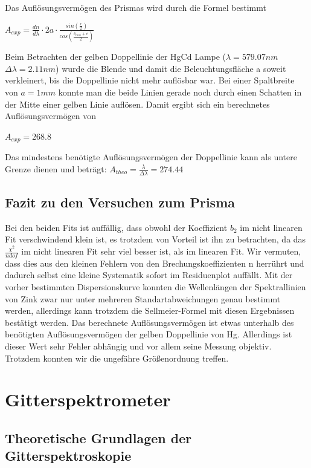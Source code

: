 \documentclass[a4paper, 11pt]{article}
\begin{document}
Das Auflösungsvermögen des Prismas wird durch die Formel bestimmt
\begin{center}
$A_{exp}=\frac{dn}{d\lambda}\cdot 2a \cdot \frac{sin(\frac{\epsilon}{2})}{cos(\frac{\delta_{min}+\epsilon}{2})}$ 
\end{center}
Beim Betrachten der gelben Doppellinie der HgCd Lampe ($\lambda=579.07nm$ $\Delta \lambda=2.11nm$) wurde die Blende und damit die Beleuchtungsfläche a soweit verkleinert, bis die Doppellinie nicht mehr auflösbar war.
Bei einer Spaltbreite von $a=1mm$ konnte man die beide Linien gerade noch durch einen Schatten in der Mitte einer gelben Linie auflösen.
Damit ergibt sich ein berechnetes Auflösungsvermögen von
\begin{center}
$A_{exp}=268.8$
\end{center}
Das mindestens benötigte Auflösungsvermögen der Doppellinie kann als untere Grenze dienen und beträgt: $A_{theo}=\frac{\lambda}{\Delta \lambda}=274.44$

\subsection{Fazit zu den Versuchen zum Prisma}
Bei den beiden Fits ist auffällig, dass obwohl der Koeffizient $b_2$ im nicht linearen Fit verschwindend klein ist, es trotzdem von Vorteil ist ihn zu betrachten, da das $\frac{\chi^2}{ndof}$ im nicht linearen Fit sehr viel besser ist, als im linearen Fit. Wir vermuten, dass dies aus den kleinen Fehlern von den Brechungskoeffizienten n herrührt und dadurch selbst eine kleine Systematik sofort im Residuenplot auffällt.
Mit der vorher bestimmten Dispersionskurve konnten die Wellenlängen der Spektrallinien von Zink zwar nur unter mehreren Standartabweichungen genau bestimmt werden, allerdings kann trotzdem die Sellmeier-Formel mit diesen Ergebnissen bestätigt werden.
Das berechnete Auflösungsvermögen ist etwas unterhalb des benötigten Auflösungsvermögen der gelben Doppellinie von Hg. Allerdings ist dieser Wert sehr Fehler abhängig und vor allem seine Messung objektiv. Trotzdem konnten wir die ungefähre Größenordnung treffen.


\clearpage
\section{Gitterspektrometer}

\subsection{Theoretische Grundlagen der Gitterspektroskopie}
\end{document}
